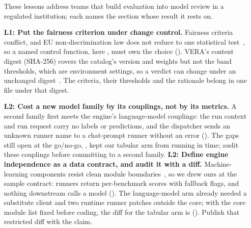 
These lessons address teams that build evaluation into model review in a regulated institution; each names the section whose result it rests on.

\textbf{L1: Put the fairness criterion under change control.}
Fairness criteria conflict, and EU non-discrimination law does not reduce to one statistical test~\cite{wachter2021fairness}, so a named control function, here \legalrisk{}, must own the choice ().
VERA's content digest (SHA-256) covers the catalog's version and weights but not the band thresholds, which are environment settings, so a verdict can change under an unchanged digest~.
The criteria, their thresholds and the rationale belong in one file under that digest.

\ifarmwithdrawn
\textbf{L2: Cost a new model family by its couplings, not by its metrics.}
A second family first meets the engine's language-model couplings: the run context and run request carry no labels or predictions, and the dispatcher sends an unknown runner name to a chat-prompt runner without an error ().
The gaps still open at the go/no-go, , kept our tabular arm from running in time; audit these couplings before committing to a second family.
\else
\textbf{L2: Define engine independence as a data contract, and audit it with a diff.}
Machine-learning components resist clean module boundaries~\cite{amershi2019software}, so we drew ours at the sample contract: runners return per-benchmark scores with fallback flags, and nothing downstream calls a model ().
The language-model arm already needed a substitute client and two runtime runner patches outside the core; with the core module list fixed before coding, the diff for the tabular arm is  ().
Publish that restricted diff with the claim.
\fi

